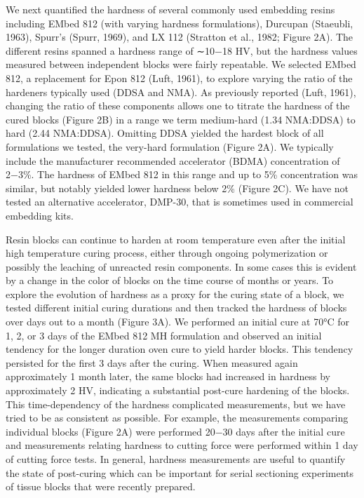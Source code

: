 \documentclass{article}
\begin{document}

We next quantified the hardness of several commonly used embedding resins including EMbed 812 (with varying hardness formulations), Durcupan (Staeubli, 1963), Spurr’s (Spurr, 1969), and LX 112 (Stratton et al., 1982; Figure 2A). The different resins spanned a hardness range of ∼10−18 HV, but the hardness values measured between independent blocks were fairly repeatable. We selected EMbed 812, a replacement for Epon 812 (Luft, 1961), to explore varying the ratio of the hardeners typically used (DDSA and NMA). As previously reported (Luft, 1961), changing the ratio of these components allows one to titrate the hardness of the cured blocks (Figure 2B) in a range we term medium-hard (1.34 NMA:DDSA) to hard (2.44 NMA:DDSA). Omitting DDSA yielded the hardest block of all formulations we tested, the very-hard formulation (Figure 2A). We typically include the manufacturer recommended accelerator (BDMA) concentration of 2−3\%. The hardness of EMbed 812 in this range and up to 5\% concentration was similar, but notably yielded lower hardness below 2\% (Figure 2C). We have not tested an alternative accelerator, DMP-30, that is sometimes used in commercial embedding kits.

Resin blocks can continue to harden at room temperature even after the initial high temperature curing process, either through ongoing polymerization or possibly the leaching of unreacted resin components. In some cases this is evident by a change in the color of blocks on the time course of months or years. To explore the evolution of hardness as a proxy for the curing state of a block, we tested different initial curing durations and then tracked the hardness of blocks over days out to a month (Figure 3A). We performed an initial cure at 70°C for 1, 2, or 3 days of the EMbed 812 MH formulation and observed an initial tendency for the longer duration oven cure to yield harder blocks. This tendency persisted for the first 3 days after the curing. When measured again approximately 1 month later, the same blocks had increased in hardness by approximately 2 HV, indicating a substantial post-cure hardening of the blocks. This time-dependency of the hardness complicated measurements, but we have tried to be as consistent as possible. For example, the measurements comparing individual blocks (Figure 2A) were performed 20−30 days after the initial cure and measurements relating hardness to cutting force were performed within 1 day of cutting force tests. In general, hardness measurements are useful to quantify the state of post-curing which can be important for serial sectioning experiments of tissue blocks that were recently prepared.
\end{document}
